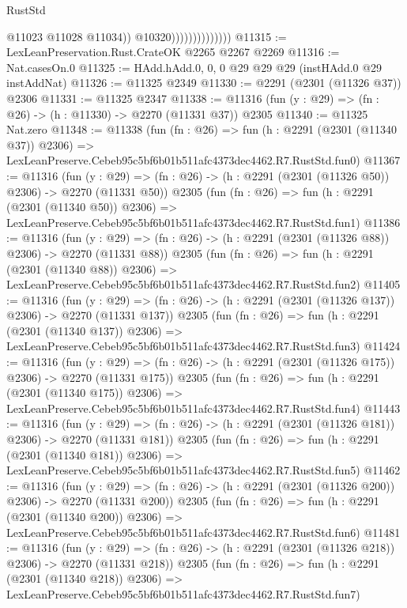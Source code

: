 \begin{lexlean}{RustStd}
\begin{coremodule}
                                    @11023
                                    @11028
                                    @11034))
                                @10320))))))))))))))
@11315 := LexLeanPreservation.Rust.CrateOK @2265 @2267 @2269
@11316 := Nat.casesOn.{0}
@11325 := HAdd.hAdd.{0, 0, 0} @29 @29 @29 (instHAdd.{0} @29 instAddNat)
@11326 := @11325 @2349
@11330 := @2291 (@2301 (@11326 @37)) @2306
@11331 := @11325 @2347
@11338 := @11316 (fun (y : @29) => (fn : @26) -> (h : @11330) -> @2270 (@11331 @37)) @2305
@11340 := @11325 Nat.zero
@11348 := @11338
    (fun (fn : @26) =>
    fun (h : @2291 (@2301 (@11340 @37)) @2306) =>
    LexLeanPreserve.Cebeb95c5bf6b01b511afc4373dec4462.R7.RustStd.fun0)
@11367 := @11316
    (fun (y : @29) => (fn : @26) -> (h : @2291 (@2301 (@11326 @50)) @2306) -> @2270 (@11331 @50))
    @2305
    (fun (fn : @26) =>
    fun (h : @2291 (@2301 (@11340 @50)) @2306) =>
    LexLeanPreserve.Cebeb95c5bf6b01b511afc4373dec4462.R7.RustStd.fun1)
@11386 := @11316
    (fun (y : @29) => (fn : @26) -> (h : @2291 (@2301 (@11326 @88)) @2306) -> @2270 (@11331 @88))
    @2305
    (fun (fn : @26) =>
    fun (h : @2291 (@2301 (@11340 @88)) @2306) =>
    LexLeanPreserve.Cebeb95c5bf6b01b511afc4373dec4462.R7.RustStd.fun2)
@11405 := @11316
    (fun (y : @29) => (fn : @26) -> (h : @2291 (@2301 (@11326 @137)) @2306) -> @2270 (@11331 @137))
    @2305
    (fun (fn : @26) =>
    fun (h : @2291 (@2301 (@11340 @137)) @2306) =>
    LexLeanPreserve.Cebeb95c5bf6b01b511afc4373dec4462.R7.RustStd.fun3)
@11424 := @11316
    (fun (y : @29) => (fn : @26) -> (h : @2291 (@2301 (@11326 @175)) @2306) -> @2270 (@11331 @175))
    @2305
    (fun (fn : @26) =>
    fun (h : @2291 (@2301 (@11340 @175)) @2306) =>
    LexLeanPreserve.Cebeb95c5bf6b01b511afc4373dec4462.R7.RustStd.fun4)
@11443 := @11316
    (fun (y : @29) => (fn : @26) -> (h : @2291 (@2301 (@11326 @181)) @2306) -> @2270 (@11331 @181))
    @2305
    (fun (fn : @26) =>
    fun (h : @2291 (@2301 (@11340 @181)) @2306) =>
    LexLeanPreserve.Cebeb95c5bf6b01b511afc4373dec4462.R7.RustStd.fun5)
@11462 := @11316
    (fun (y : @29) => (fn : @26) -> (h : @2291 (@2301 (@11326 @200)) @2306) -> @2270 (@11331 @200))
    @2305
    (fun (fn : @26) =>
    fun (h : @2291 (@2301 (@11340 @200)) @2306) =>
    LexLeanPreserve.Cebeb95c5bf6b01b511afc4373dec4462.R7.RustStd.fun6)
@11481 := @11316
    (fun (y : @29) => (fn : @26) -> (h : @2291 (@2301 (@11326 @218)) @2306) -> @2270 (@11331 @218))
    @2305
    (fun (fn : @26) =>
    fun (h : @2291 (@2301 (@11340 @218)) @2306) =>
    LexLeanPreserve.Cebeb95c5bf6b01b511afc4373dec4462.R7.RustStd.fun7)

\end{coremodule}
\end{lexlean}
